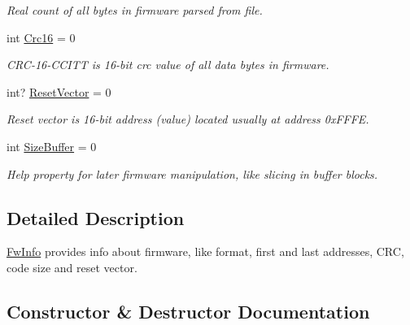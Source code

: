 \begin{DoxyCompactItemize}
\begin{DoxyCompactList}\small\item\em Real count of all bytes in firmware parsed from file. \end{DoxyCompactList}\item 
int \mbox{\hyperlink{class_b_s_l430___n_e_t_1_1_firmware_tools_1_1_fw_tools_1_1_fw_info_ace4d79f2f0167ee49199ecf909dacce0}{Crc16}} = 0
\begin{DoxyCompactList}\small\item\em C\+R\+C-\/16-\/\+C\+C\+I\+TT is 16-\/bit crc value of all data bytes in firmware. \end{DoxyCompactList}\item 
int? \mbox{\hyperlink{class_b_s_l430___n_e_t_1_1_firmware_tools_1_1_fw_tools_1_1_fw_info_aaa106f267ffe7b7ca8faa7ea6437796d}{Reset\+Vector}} = 0
\begin{DoxyCompactList}\small\item\em Reset vector is 16-\/bit address (value) located usually at address 0x\+F\+F\+FE. \end{DoxyCompactList}\item 
int \mbox{\hyperlink{class_b_s_l430___n_e_t_1_1_firmware_tools_1_1_fw_tools_1_1_fw_info_afd0fba26ece185bfecbfe71d50230581}{Size\+Buffer}} = 0
\begin{DoxyCompactList}\small\item\em Help property for later firmware manipulation, like slicing in buffer blocks. \end{DoxyCompactList}\end{DoxyCompactItemize}


\subsection{Detailed Description}
\mbox{\hyperlink{class_b_s_l430___n_e_t_1_1_firmware_tools_1_1_fw_tools_1_1_fw_info}{Fw\+Info}} provides info about firmware, like format, first and last addresses, C\+RC, code size and reset vector. 



\subsection{Constructor \& Destructor Documentation}
\mbox{\label{class_b_s_l430___n_e_t_1_1_firmware_tools_1_1_fw_tools_1_1_fw_info_a9df8f08dbbc374727b6c1cdf2db0117a}} 
